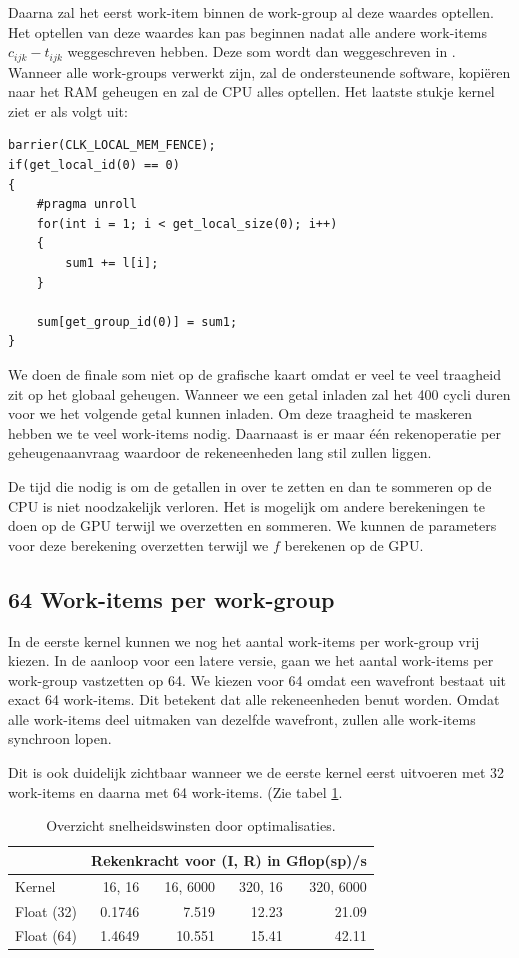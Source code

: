 Daarna zal het eerst work-item binnen de work-group al deze waardes optellen. Het optellen van deze waardes kan pas beginnen nadat alle andere work-items $c_{ijk} - t_{ijk}$ weggeschreven hebben. Deze som wordt dan weggeschreven in . Wanneer alle work-groups verwerkt zijn, zal de ondersteunende software,  kopi\"eren naar het RAM geheugen en zal de CPU alles optellen. Het laatste stukje kernel ziet er als volgt uit:
\begin{lstlisting}
barrier(CLK_LOCAL_MEM_FENCE);
if(get_local_id(0) == 0)
{        
    #pragma unroll
    for(int i = 1; i < get_local_size(0); i++)
    {
        sum1 += l[i];
    }
    
    sum[get_group_id(0)] = sum1;
}
\end{lstlisting}

We doen de finale som niet op de grafische kaart omdat er veel te veel traagheid zit op het globaal geheugen. Wanneer we een getal inladen zal het 400 cycli duren voor we het volgende getal kunnen inladen. Om deze traagheid te maskeren hebben we te veel work-items nodig. Daarnaast is er maar \'e\'en rekenoperatie per geheugenaanvraag waardoor de rekeneenheden lang stil zullen liggen. 

De tijd die nodig is om de getallen in  over te zetten en dan te sommeren op de CPU is niet noodzakelijk verloren. Het is mogelijk om andere berekeningen te doen op de GPU terwijl we  overzetten en sommeren. We kunnen de parameters voor deze berekening overzetten terwijl we $f$ berekenen op de GPU.

\subsection{64 Work-items per work-group}
In de eerste kernel kunnen we nog het aantal work-items per work-group vrij kiezen. In de aanloop voor een latere versie, gaan we het aantal work-items per work-group vastzetten op 64. We kiezen voor 64 omdat een wavefront bestaat uit exact 64 work-items. Dit betekent dat alle rekeneenheden benut worden. Omdat alle work-items deel uitmaken van dezelfde wavefront, zullen alle work-items synchroon lopen.

Dit is ook duidelijk zichtbaar wanneer we de eerste kernel eerst uitvoeren met 32 work-items en daarna met 64 work-items. (Zie tabel \ref{measF3264}.

\begin{table}
	\centering
    \begin{tabular}{|l| r|r| r |r|}
		\hline
						& \multicolumn{4}{c|}{Rekenkracht voor (I, R) in Gflop(sp)/s}\\
		\hline
		Kernel          & 16, 16 	& 16, 6000	& 320, 16	&  320, 6000 \\
		\hline
		Float (32)      & 0.1746  	& 7.519   	& 12.23 	& 21.09 	\\
		Float (64)      & 1.4649	& 10.551  	& 15.41  	& 42.11  	\\
		\hline
    \end{tabular}
    \caption{\label{measF3264} Overzicht snelheidswinsten door optimalisaties.}
\end{table} 

